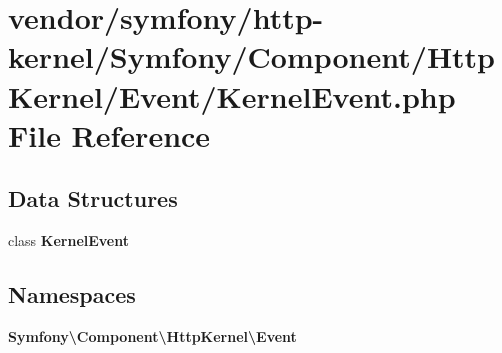 \section{vendor/symfony/http-\/kernel/\+Symfony/\+Component/\+Http\+Kernel/\+Event/\+Kernel\+Event.php File Reference}
\label{_kernel_event_8php}
\subsection*{Data Structures}
\begin{DoxyCompactItemize}
\item 
class {\bf Kernel\+Event}
\end{DoxyCompactItemize}
\subsection*{Namespaces}
\begin{DoxyCompactItemize}
\item 
 {\bf Symfony\textbackslash{}\+Component\textbackslash{}\+Http\+Kernel\textbackslash{}\+Event}
\end{DoxyCompactItemize}
